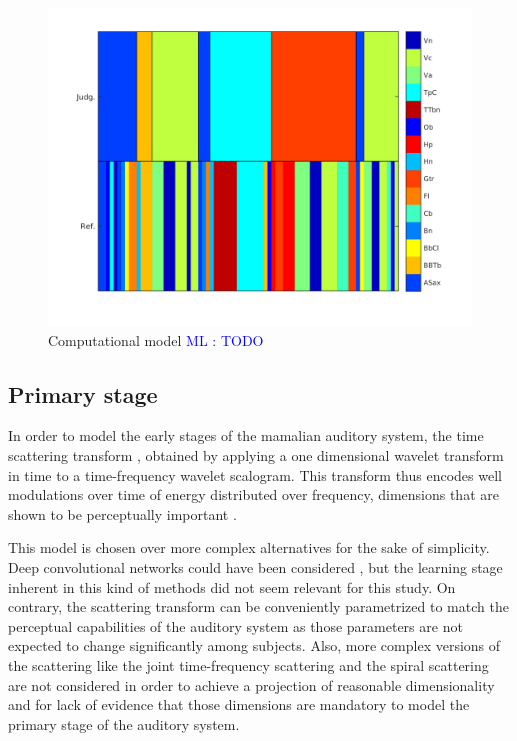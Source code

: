 \documentclass{article}
\newcommand{\ml}[1]{\textcolor{blue}{ML : #1}}
\begin{document}
\begin{figure}
\center
\includegraphics[width = \textwidth]{figures/groupInstruments.png}
\caption{Computational model \ml{TODO}}
\label{fig:model}
\end{figure}

\subsection{Primary stage}

In order to model the early stages of the mamalian auditory system, the time scattering transform \cite{anden2014deep}, obtained by applying a one dimensional
wavelet transform in time to a time-frequency wavelet scalogram. This transform thus encodes well modulations over time of energy distributed over frequency, dimensions that are shown to be perceptually important \cite{dau1997modeling}.

This model is chosen over more complex alternatives for the sake of simplicity. Deep convolutional networks could have been considered \cite{lee2009unsupervised}, but the learning stage inherent in this kind of methods did not seem relevant for this study. On contrary, the scattering transform can be conveniently parametrized to match the perceptual capabilities of the auditory system as those parameters are not expected to change significantly among subjects. Also, more complex versions of the scattering like the joint time-frequency scattering \cite{anden2015joint} and the spiral scattering \cite{lostanlen2016wavelet} are not considered in order to achieve a projection of reasonable dimensionality and for lack of evidence that those dimensions are mandatory to model the primary stage of the auditory system.
\end{document}
